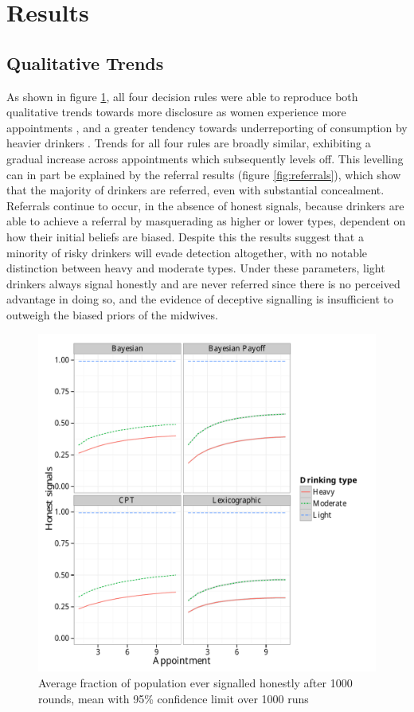 \section{Results}
\label{sec:results}


\subsection{Qualitative Trends}
\label{sub:qt_results}

As shown in figure \ref{fig:honest_signals}, all four decision rules were able to reproduce both qualitative trends towards more disclosure as women experience more appointments \citep{Phillips2007}, and a greater tendency towards underreporting of consumption by heavier drinkers \citep{Alvik2006}.  Trends for all four rules are broadly similar, exhibiting a gradual increase across appointments which subsequently levels off. This levelling can in part be explained by the referral results (figure \ref{fig:referrals}), which show that the majority of drinkers are referred, even with substantial concealment. Referrals continue to occur, in the absence of honest signals, because drinkers are able to achieve a referral by masquerading as higher or lower types, dependent on how their initial beliefs are biased. Despite this the results suggest that a minority of risky drinkers will evade detection altogether, with no notable distinction between heavy and moderate types. Under these parameters, light drinkers always signal honestly and are never referred since there is no perceived advantage in doing so, and the evidence of deceptive signalling is insufficient to outweigh the biased priors of the midwives. 

\begin{figure}[H]
\includegraphics[width=119mm]{figures/honesty_plot}
\caption{Average fraction of population ever signalled honestly after 1000 rounds, mean with 95\% confidence limit over 1000 runs\label{fig:honest_signals}}
\end{figure}

